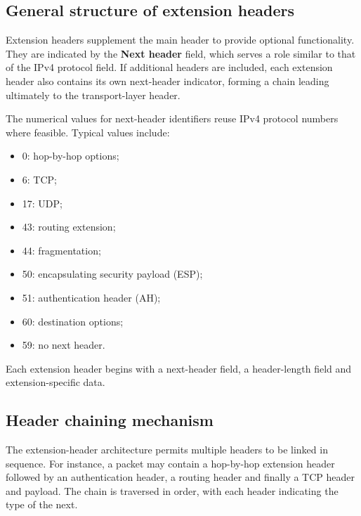 \subsection{General structure of extension headers}

Extension headers supplement the main header to provide optional functionality. They are indicated by the \textbf{Next header} field, which serves a role similar to that of the IPv4 protocol field. If additional headers are included, each extension header also contains its own next-header indicator, forming a chain leading ultimately to the transport-layer header.

The numerical values for next-header identifiers reuse IPv4 protocol numbers where feasible. Typical values include:

\begin{itemize}
\item 0: hop-by-hop options;
\item 6: TCP;
\item 17: UDP;
\item 43: routing extension;
\item 44: fragmentation;
\item 50: encapsulating security payload (ESP);
\item 51: authentication header (AH);
\item 60: destination options;
\item 59: no next header.
\end{itemize}

Each extension header begins with a next-header field, a header-length field and extension-specific data.

\begin{center}
\end{center}

\subsection{Header chaining mechanism}

The extension-header architecture permits multiple headers to be linked in sequence. For instance, a packet may contain a hop-by-hop extension header followed by an authentication header, a routing header and finally a TCP header and payload. The chain is traversed in order, with each header indicating the type of the next.

\begin{center}
\end{center}

